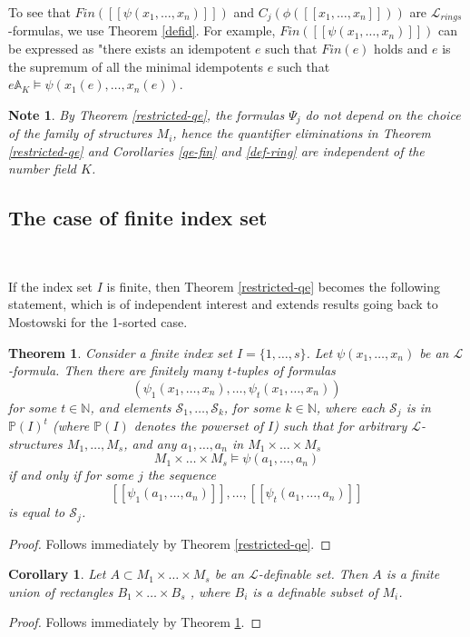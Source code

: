 \documentclass[12pt]{amsart}
\def\A{\mathbb{A}}
\def\P{\mathbb{P}}
\def\S{\mathcal{S}}
\def\N{\mathbb{N}}
\def\cL{\mathcal{L}}
\def\cL{\mathcal{L}}
\newtheorem{thm}{Theorem}[section]
\newtheorem{cor}{Corollary}[section]
\numberwithin{equation}{section}
\newtheorem{note}{Note}[section]
\begin{document}
To see that $Fin([[\psi(x_1,\dots,x_n)]])$ and $C_j(\phi([[x_1,\dots,x_n]]))$ are $\cL_{rings}$-formulas, we use Theorem \ref{defid}. For example, $Fin([[\psi(x_1,\dots,x_n)]])$ can be expressed as "there exists an idempotent $e$ such that $Fin(e)$ holds and $e$ is the supremum of all the minimal idempotents $e$ such that $e\A_K \models \psi(x_1(e),\dots,x_n(e))$. 

\begin{note} By Theorem \ref{restricted-qe}, the formulas $\Psi_j$ do not depend on the choice of the family of structures $M_i$, hence the quantifier eliminations in Theorem \ref{restricted-qe} and Corollaries 
\ref{qe-fin} and \ref{def-ring} are independent of the number field $K$.\end{note}

\medskip

\subsection{\bf The case of finite index set}\label{ssec-finindex}

\

\medskip

 If the index set $I$ is finite, then 
Theorem \ref{restricted-qe} becomes the following statement, which is of independent interest and extends results going back to Mostowski for the 1-sorted case.

\begin{thm}\cite{DM-ad}\label{fv-fin-prod} Consider a finite  index set $I=\{1,\dots,s\}$. 
Let $\psi(x_1,\dots,x_n)$ be an $\cL$-formula. Then there are finitely many 
$t$-tuples of formulas 
$$(\psi_1(x_1,\dots,x_n),\dots,\psi_t(x_1,\dots,x_n))$$
for some $t\in \N$, 
and elements $\S_1,\dots,\S_k$, for some $k\in \N$, where each $\S_j$
is in $\P(I)^{t}$ (where $\P(I)$ denotes the powerset of $I$)
such that for arbitrary $\cL$-structures $M_1,\dots,M_s$, and any 
$a_1,\dots,a_n$ in $M_1\times \dots \times M_s$
$$M_1\times \dots \times M_s\models \psi(a_1,\dots,a_n)$$
if and only if for some $j$ the sequence 
$$[[\psi_1(a_1,\dots,a_n)]],\dots,[[\psi_t(a_1,\dots,a_n)]]$$ is equal to $\S_j$.

\end{thm}
\begin{proof} Follows immediately by Theorem \ref{restricted-qe}.\end{proof}

\begin{cor}\cite{DM-ad}\label{mostowski} Let $A\subset M_1 \times \dots \times M_s$ be an $\cL$-definable set.
Then $A$ is a finite union of rectangles
 $ B_1 \times \dots \times B_s$ , where $B_i$ is a definable subset of $M_i$.
\end{cor}
\begin{proof} Follows immediately by Theorem \ref{fv-fin-prod}.
\end{proof}
\end{document}
